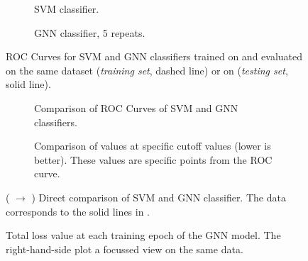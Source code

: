 \documentclass[
	fontsize=10pt, %
	twoside=false, %
	secnumdepth=1, %
  toc=indentunnumbered %
]{kaobook}
\begin{document}
\begin{figure}[h]
  \centering
  \begin{subfigure}[h]{0.49\linewidth}
    \caption{SVM classifier.}
  \end{subfigure}
  \begin{subfigure}[h]{0.49\linewidth}
    \caption{GNN classifier, 5 repeats.  }
  \end{subfigure}
  \caption{ROC Curves for SVM and GNN classifiers trained on \ADMap{}
    and evaluated on the same dataset (\textit{training set}, dashed line) or on \PDMap
    (\textit{testing set}, solid line).}
  \label{fig:svm-repro-comparison}
\end{figure}
%
\begin{figure}[h]
  \centering
  \begin{subfigure}[h]{0.49\linewidth}
    \caption{Comparison of ROC Curves of SVM and GNN classifiers.}
  \end{subfigure}
  \begin{subfigure}[h]{0.49\linewidth}
    \caption{Comparison of \FPR{} values at specific \TPR{} cutoff values (lower is better). These
      values are specific points from the ROC curve.}
  \end{subfigure}
  \caption{(\ADMap{} $\rightarrow$ \PDMap) Direct comparison of SVM and GNN classifier. The data
    corresponds to the solid lines in .}
  \label{fig:svm-repro-roc-train-test}
\end{figure}


\begin{figure}[h]
  \centering
  \begin{subfigure}[h]{0.49\linewidth}
  \end{subfigure}
  \begin{subfigure}[h]{0.49\linewidth}
  \end{subfigure}
  \caption{Total loss value at each training epoch of the GNN model. The right-hand-side plot a
    focussed view on the same data.}
  \label{fig:svm-repro-loss}
\end{figure}
\end{document}
